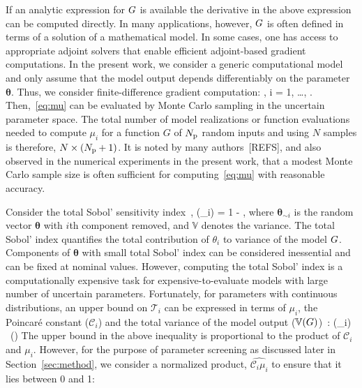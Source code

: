 If an analytic expression for $G$ is available the derivative in the above
expression can be computed directly. In many applications, however, $G$ is often
defined in terms of a solution of a mathematical model. In some cases, 
one has access to appropriate adjoint solvers that enable efficient
adjoint-based gradient computations. In the present work, we consider
a generic computational model and only assume that the model
output depends differentiably on the parameter $\bm{\theta}$. Thus, 
we consider finite-difference gradient computation: 
\be
{} 
\approx
{}, \quad i = 1, \ldots, \Np. 
\label{eq:partial}
\ee
Then,~\eqref{eq:mu} can be evaluated by Monte Carlo sampling in
the uncertain parameter space. 
The total number of model realizations or function evaluations
needed to
compute $\mu_i$ for a function $G$ of ${N_\text{p}}$ random inputs and using $N$ samples is
therefore, $N\times({N_\text{p}}+1)$. 
It is noted by many authors~[REFS], and also observed
in the numerical experiments in the present work, that a modest Monte Carlo
sample size is often sufficient for computing~\eqref{eq:mu} with reasonable
accuracy.

Consider the total 
Sobol' sensitivity index~\cite{Sobol:2001},
\be
{}(\theta_i) = 1 - 
,
\label{eq:total}
\ee
where $\bm{\theta}_{\sim i}$ is the random vector $\bm\theta$ with $i$th component removed, 
and $\mathbb{V}$ denotes the variance. The total Sobol' index quantifies the total contribution 
of $\theta_i$ to variance of the model $G$. Components of $\bm\theta$ with small 
total Sobol' index can be considered inessential and can be fixed at nominal values. However, 
computing the total Sobol' index is a computationally expensive task for expensive-to-evaluate 
models with large number of uncertain parameters. Fortunately, 
for parameters with continuous distributions, an upper bound on $\mathcal{T}_i$  
can be expressed in terms of $\mu_i$, the Poincar\'e constant ($\mathcal{C}_i$) and the total 
variance of the model output ($\mathbb{V}(G)$)~\cite{Lamboni:2013}:
\be
{}(\theta_i) \leq {}~(\propto {})
\label{eq:bound}
\ee
The upper bound in the above inequality is proportional to the product of
$\mathcal{C}_i$ and $\mu_i$. However, for the purpose of parameter screening as
discussed later in Section~\ref{sec:method}, we consider a normalized product,
$\widehat{\mathcal{C}_i\mu_i}$ to ensure that it lies between 0 and 1:

